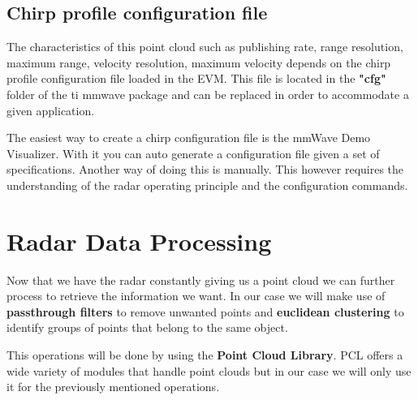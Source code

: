 \subsection{Chirp profile configuration file}
The characteristics of this point cloud such as publishing rate, range resolution, maximum range, velocity resolution, maximum velocity depends on the chirp profile configuration file loaded in the EVM. This file is located in the \textbf{"cfg"} folder of the ti mmwave package and can be replaced in order to accommodate a given application.

The easiest way to create a chirp configuration file is the mmWave Demo Visualizer. With it you can auto generate a configuration file given a set of specifications.
Another way of doing this is manually. This however requires the understanding of the radar operating principle and the configuration commands.

\section{Radar Data Processing}
Now that we have the radar constantly giving us a point cloud we can further process to retrieve the information we want. 
In our case we will make use of \textbf{passthrough filters} to remove unwanted points and \textbf{euclidean clustering} to identify groups of points that belong to the same object.

This operations will be done by using the \textbf{Point Cloud Library}. PCL offers a wide variety of modules that handle point clouds but in our case we will only use it for the previously mentioned operations.

